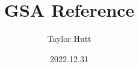 \documentclass[10pt]{book}
\title {GSA Reference}
\author{Taylor Hutt}
\date{2022.12.31}
\begin{document}

\maketitle
\tableofcontents
\listoffigures
\listoftables
\listofalgorithms









\end{document}
